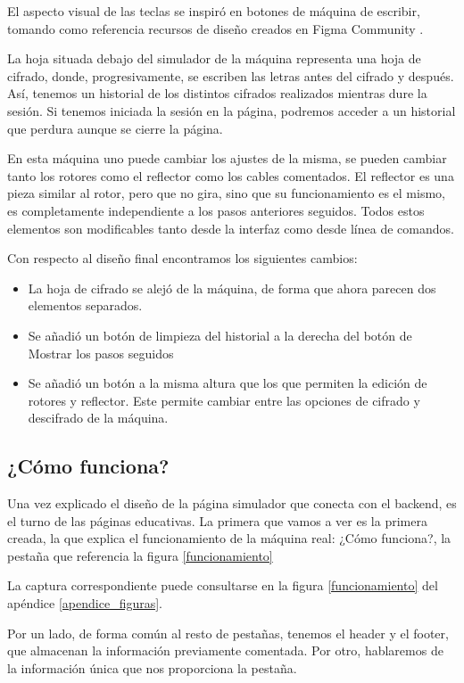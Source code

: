 El aspecto visual de las teclas se inspiró en botones de máquina de escribir, tomando como referencia recursos de diseño creados en Figma Community \cite{figma_typer}.

La hoja situada debajo del simulador de la máquina representa una hoja de cifrado, donde, progresivamente, se escriben las letras antes del cifrado y después. Así, tenemos un historial de los distintos cifrados realizados mientras dure la sesión. Si tenemos iniciada la sesión en la página, podremos acceder a un historial que perdura aunque se cierre la página.

En esta máquina uno puede cambiar los ajustes de la misma, se pueden cambiar tanto los rotores como el reflector como los cables comentados. El reflector es una pieza similar al rotor, pero que no gira, sino que su funcionamiento es el mismo, es completamente independiente a los pasos anteriores seguidos. Todos estos elementos son modificables tanto desde la interfaz como desde línea de comandos. 

Con respecto al diseño final encontramos los siguientes cambios:
\begin{itemize}
	\item La hoja de cifrado se alejó de la máquina, de forma que ahora parecen dos elementos separados.
	\item Se añadió un botón de limpieza del historial a la derecha del botón de Mostrar los pasos seguidos
	\item Se añadió un botón a la misma altura que los que permiten la edición de rotores y reflector. Este permite cambiar entre las opciones de cifrado y descifrado de la máquina.
\end{itemize}

\subsection{¿Cómo funciona?}

Una vez explicado el diseño de la página simulador que conecta con el backend, es el turno de las páginas educativas. La primera que vamos a ver es la primera creada, la que explica el funcionamiento de la máquina real: ¿Cómo funciona?, la pestaña que referencia la figura \ref{funcionamiento}

La captura correspondiente puede consultarse en la figura \ref{funcionamiento} del apéndice \ref{apendice_figuras}.

Por un lado, de forma común al resto de pestañas, tenemos el header y el footer, que almacenan la información previamente comentada. Por otro, hablaremos de la información única que nos proporciona la pestaña. 

